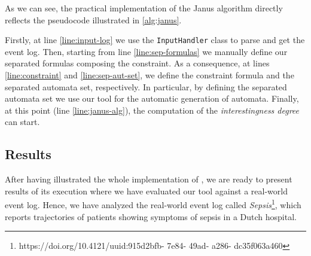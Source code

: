 As we can see, the practical implementation of the Janus algorithm directly reflects the pseudocode illustrated in \ref{alg:janus}. 

Firstly, at line \ref{line:input-log} we use the \texttt{InputHandler} class to parse and get the event log. Then, starting from line \ref{line:sep-formulas} we manually define our separated formulas composing the constraint. As a consequence, at lines \ref{line:constraint} and \ref{line:sep-aut-set}, we define the constraint formula and the separated automata set, respectively. In particular, by defining the separated automata set we use our tool \LTLfToDFA for the automatic generation of automata. Finally, at this point (line \ref{line:janus-alg}), the computation of the \textit{interestingness degree} can start.
\subsection{Results}
After having illustrated the whole implementation of \janus, we are ready to present results of its execution where we have evaluated our tool against a real-world event log. Hence, we have analyzed the real-world event log called \textit{Sepsis}\footnote{https://doi.org/10.4121/uuid:915d2bfb- 7e84- 49ad- a286- dc35f063a460}, which reports trajectories of patients showing symptoms of sepsis in a Dutch hospital.

